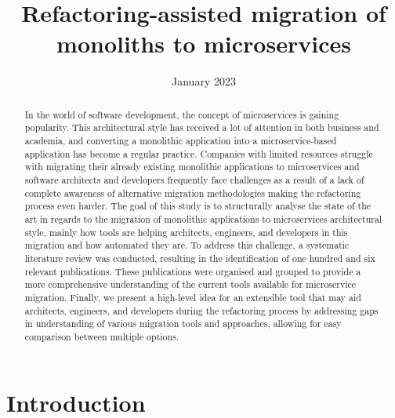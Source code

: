 \documentclass[conference]{IEEEtran}
\title{Refactoring-assisted migration of monoliths to microservices}
\author{
  \IEEEauthorblockN{Breno Salles}
  \IEEEauthorblockA{
    \textit{Faculty of Engineering} \\
    \textit{University of Porto}\\
    Porto, Portugal \\
    up202103389@fe.up.pt
  }
}
\date{January 2023}
\begin{document}
\maketitle

\begin{abstract}

 In the world of software development, the concept of microservices is gaining
 popularity. This architectural style has received a lot of attention in both
 business and academia, and converting a monolithic application into a
 microservice-based application has become a regular practice. Companies with
 limited resources struggle with migrating their already existing monolithic
 applications to microservices and software architects and developers
 frequently face challenges as a result of a lack of complete awareness of
 alternative migration methodologies making the refactoring process even
 harder. The goal of this study is to structurally analyse the state of the
 art in regards to the migration of monolithic applications to microservices
 architectural style, mainly how tools are helping architects, engineers, and
 developers in this migration and how automated they are. To address this
 challenge, a systematic literature review was conducted, resulting in the
 identification of one hundred and six relevant publications. These
 publications were organised and grouped to provide a more comprehensive
 understanding of the current tools available for microservice migration.
 Finally, we present a high-level idea for an extensible tool that may aid
 architects, engineers, and developers during the refactoring process by
 addressing gaps in understanding of various migration tools and approaches,
 allowing for easy comparison between multiple options.

\end{abstract}

\section{Introduction} \label{sec:introduction}
\end{document}
